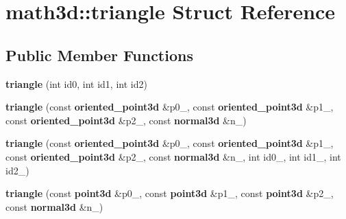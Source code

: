\section{math3d\-:\-:triangle Struct Reference}
\label{structmath3d_1_1triangle}
\subsection*{Public Member Functions}
\begin{DoxyCompactItemize}
\item 
{\bfseries triangle} (int id0, int id1, int id2)\label{structmath3d_1_1triangle_acede05b13468e85ae1156f1fd64f7af5}

\item 
{\bfseries triangle} (const {\bf oriented\-\_\-point3d} \&p0\-\_\-, const {\bf oriented\-\_\-point3d} \&p1\-\_\-, const {\bf oriented\-\_\-point3d} \&p2\-\_\-, const {\bf normal3d} \&n\-\_\-)\label{structmath3d_1_1triangle_a6f2c03ec1dbd09e70ccafe63d02c33de}

\item 
{\bfseries triangle} (const {\bf oriented\-\_\-point3d} \&p0\-\_\-, const {\bf oriented\-\_\-point3d} \&p1\-\_\-, const {\bf oriented\-\_\-point3d} \&p2\-\_\-, const {\bf normal3d} \&n\-\_\-, int id0\-\_\-, int id1\-\_\-, int id2\-\_\-)\label{structmath3d_1_1triangle_a1281b8ee33e6b4fb4bb3a835a64de861}

\item 
{\bfseries triangle} (const {\bf point3d} \&p0\-\_\-, const {\bf point3d} \&p1\-\_\-, const {\bf point3d} \&p2\-\_\-, const {\bf normal3d} \&n\-\_\-)\label{structmath3d_1_1triangle_a8bbb629ffe457e22ed0655637cbd70eb}

\end{DoxyCompactItemize}
